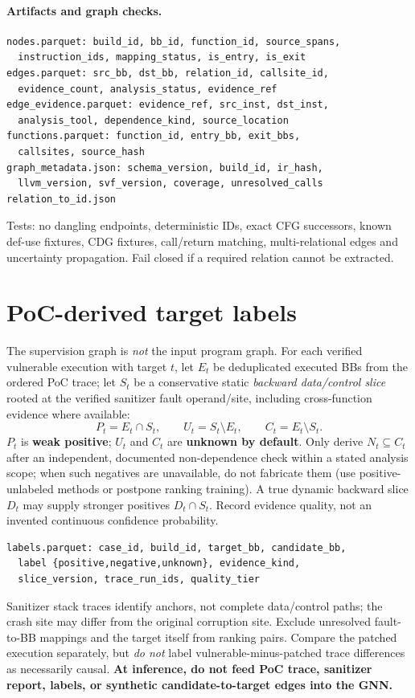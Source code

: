 \documentclass[10pt,a4paper]{article}
\begin{document}
\paragraph{Artifacts and graph checks.}
\begin{lstlisting}
nodes.parquet: build_id, bb_id, function_id, source_spans,
  instruction_ids, mapping_status, is_entry, is_exit
edges.parquet: src_bb, dst_bb, relation_id, callsite_id,
  evidence_count, analysis_status, evidence_ref
edge_evidence.parquet: evidence_ref, src_inst, dst_inst,
  analysis_tool, dependence_kind, source_location
functions.parquet: function_id, entry_bb, exit_bbs,
  callsites, source_hash
graph_metadata.json: schema_version, build_id, ir_hash,
  llvm_version, svf_version, coverage, unresolved_calls
relation_to_id.json
\end{lstlisting}
Tests: no dangling endpoints, deterministic IDs, exact CFG successors, known def-use fixtures, CDG fixtures, call/return matching, multi-relational edges and uncertainty propagation. Fail closed if a required relation cannot be extracted.

\section{PoC-derived target labels}
The supervision graph is \emph{not} the input program graph. For each verified vulnerable execution with target $t$, let $E_t$ be deduplicated executed BBs from the ordered PoC trace; let $S_t$ be a conservative static \emph{backward data/control slice} rooted at the verified sanitizer fault operand/site, including cross-function evidence where available:
\[
 P_t=E_t\cap S_t,\qquad U_t=S_t\setminus E_t,\qquad C_t=E_t\setminus S_t.
\]
$P_t$ is \textbf{weak positive}; $U_t$ and $C_t$ are \textbf{unknown by default}. Only derive $N_t\subseteq C_t$ after an independent, documented non-dependence check within a stated analysis scope; when such negatives are unavailable, do not fabricate them (use positive-unlabeled methods or postpone ranking training). A true dynamic backward slice $D_t$ may supply stronger positives $D_t\cap S_t$. Record evidence quality, not an invented continuous confidence probability.

\begin{lstlisting}
labels.parquet: case_id, build_id, target_bb, candidate_bb,
  label {positive,negative,unknown}, evidence_kind,
  slice_version, trace_run_ids, quality_tier
\end{lstlisting}
Sanitizer stack traces identify anchors, not complete data/control paths; the crash site may differ from the original corruption site. Exclude unresolved fault-to-BB mappings and the target itself from ranking pairs. Compare the patched execution separately, but \emph{do not} label vulnerable-minus-patched trace differences as necessarily causal. \textbf{At inference, do not feed PoC trace, sanitizer report, labels, or synthetic candidate-to-target edges into the GNN.}
\end{document}
